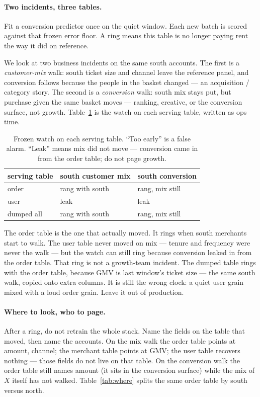 \documentclass[11pt]{article}
\begin{document}
\paragraph{Two incidents, three tables.}
Fit a conversion predictor once on the quiet window.
Each new batch is scored against that frozen error floor.
A ring means this table is no longer paying rent the way it did on reference.

We look at two business incidents on the same south accounts.
The first is a \emph{customer-mix} walk: south ticket size and channel leave the reference panel, and conversion follows because the people in the basket changed --- an acquisition / category story.
The second is a \emph{conversion} walk: south mix stays put, but purchase given the same basket moves --- ranking, creative, or the conversion surface, not growth.
Table~\ref{tab:when} is the watch on each serving table, written as ops time.

\begin{table}[H]
\centering
\caption{Frozen watch on each serving table. ``Too early'' is a false alarm. ``Leak'' means mix did not move --- conversion came in from the order table; do not page growth.}
\label{tab:when}
\begin{tabular}{lll}
\toprule
serving table & south customer mix & south conversion \\
\midrule
order & rang with south & rang, mix still \\
user & leak & leak \\
dumped all & rang with south & rang, mix still \\
\bottomrule
\end{tabular}
\end{table}

The order table is the one that actually moved.
It rings when south merchants start to walk.
The user table never moved on mix --- tenure and frequency were never the walk --- but the watch can still ring because conversion leaked in from the order table.
That ring is not a growth-team incident.
The dumped table rings with the order table, because GMV is last window's ticket size --- the same south walk, copied onto extra columns.
It is still the wrong clock: a quiet user grain mixed with a loud order grain.
Leave it out of production.

\paragraph{Where to look, who to page.}
After a ring, do not retrain the whole stack.
Name the fields on the table that moved, then name the accounts.
On the mix walk the order table points at amount, channel; the merchant table points at GMV; the user table recovers nothing --- those fields do not live on that table.
On the conversion walk the order table still names amount (it sits in the conversion surface) while the mix of $X$ itself has not walked.
Table~\ref{tab:where} splits the same order table by south versus north.
\end{document}
